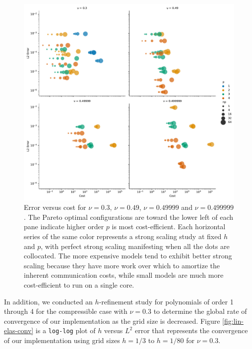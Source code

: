 \begin{figure}[pbt!]
 \begin{center}
      \includegraphics[width=1\textwidth]{../img/error-cost.pdf}
\end{center}
\caption{
Error versus cost for $\nu = 0.3$, $\nu = 0.49$, $\nu = 0.49999$ and $\nu = 0.499999$.
The Pareto optimal configurations are toward the lower left of each pane indicate higher order $p$ is most cost-efficient.
Each horizontal series of the same color represents a strong scaling study at fixed $h$ and $p$, with perfect strong scaling manifesting when all the dots are collocated.
The more expensive models tend to exhibit better strong scaling because they have more work over which to amortize the inherent communication costs, while small models are much more cost-efficient to run on a single core.
}
    \label{fig:error-cost}
\end{figure}

In addition, we conducted an $h$-refinement study for polynomials of order 1 through 4 for the compressible case with $\nu = 0.3$ to determine the global rate of convergence of our implementation as the grid size is decreased.
Figure \ref{fig:lin-elas-conv} is a \texttt{log-log} plot of $h$ versus $L^2$ error that represents the convergence of our implementation using grid sizes $h = 1/3$ to $h = 1/80$ for $\nu = 0.3$.

